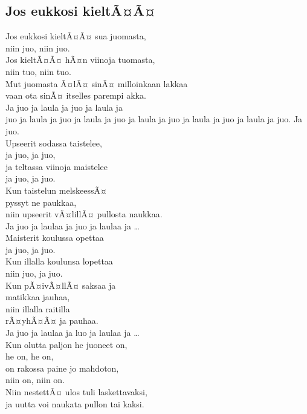 \documentclass[a4paper,12pt,oneside]{lauluvihko}
\begin{document}
\begin{multicols}{2}
\section{Jos eukkosi kieltÃ¤Ã¤}
Jos eukkosi kieltÃ¤Ã¤ sua juomasta,\\ 
niin juo, niin juo.\\ 
Jos kieltÃ¤Ã¤ hÃ¤n viinoja tuomasta, \\ 
niin tuo, niin tuo. \\ 
Mut juomasta Ã¤lÃ¤ sinÃ¤ milloinkaan lakkaa\\ 
vaan ota sinÃ¤ itselles parempi akka.\\ 

Ja juo ja laula ja juo ja laula ja\\ 
juo ja laula ja juo ja laula ja juo ja laula ja juo ja laula ja juo ja laula ja juo. Ja juo.\\ 

Upseerit sodassa taistelee,\\ 
ja juo, ja juo,\\ 
ja teltassa viinoja maistelee\\ 
ja juo, ja juo.\\ 
Kun taistelun melskeessÃ¤\\ 
pyssyt ne paukkaa,\\ 
niin upseerit vÃ¤lillÃ¤ pullosta naukkaa. \\ 

Ja juo ja laulaa ja juo ja laulaa ja \ldots \\ 

Maisterit koulussa opettaa\\ 
ja juo, ja juo. \\ 
Kun illalla koulunsa lopettaa\\ 
niin juo, ja juo.\\ 
Kun pÃ¤ivÃ¤llÃ¤ saksaa ja\\ 
matikkaa jauhaa,\\ 
niin illalla raitilla\\ 
rÃ¤yhÃ¤Ã¤ ja pauhaa.\\ 

Ja juo ja laulaa ja luo ja laulaa ja \ldots\\ 

Kun olutta paljon he juoneet on,\\ 
he on, he on,\\ 
on rakossa paine jo mahdoton,\\ 
niin on, niin on.\\ 
Niin nestettÃ¤ ulos tuli laskettavaksi,\\ 
ja uutta voi naukata pullon tai kaksi.\\ 
 

\end{multicols}
\end{document}
